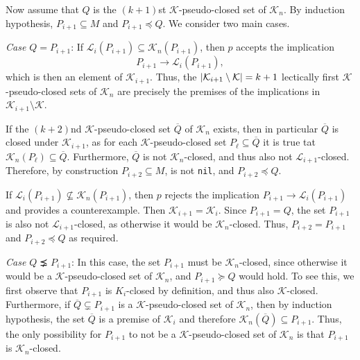 \begin{Proof}
  Now assume that $Q$ is the $(k+1)$st $\mathcal{K}$-pseudo-closed set of
  $\mathcal{K}_{n}$.  By induction hypothesis, $P_{i+1} \subseteq M$ and $P_{i+1} \preceq
  Q$.  We consider two main cases.

  \textit{Case $Q = P_{i+1}$}:  If $\mathcal{L}_{i}(P_{i+1}) \subseteq
  \mathcal{K}_{n}(P_{i+1})$, then $p$ accepts the implication
  \begin{equation*}
    P_{i+1} \to \mathcal{L}_{i}(P_{i+1}),
  \end{equation*}
  which is then an element of $\mathcal{K}_{i+1}$.  Thus, the $\lvert \mathcal{K}_{i+1}
    \setminus \mathcal{K} \rvert = k + 1$ lectically first $\mathcal{K}$-pseudo-closed sets of
  $\mathcal{K}_{n}$ are precisely the premises of the implications in $\mathcal{K}_{i+1}
  \setminus \mathcal{K}$.

  If the $(k+2)$nd $\mathcal{K}$-pseudo-closed set $\overline Q$ of $\mathcal{K}_{n}$
  exists, then in particular $\overline Q$ is closed under $\mathcal{K}_{i+1}$, as for
  each $\mathcal{K}$-pseudo-closed set $P_{\ell} \subseteq \overline Q$ it is true tat
  $\mathcal{K}_{n}(P_{\ell}) \subseteq \overline Q$.  Furthermore, $\overline Q$ is not
  $\mathcal{K}_{n}$-closed, and thus also not $\mathcal{L}_{i+1}$-closed.  Therefore, by
  construction $P_{i+2} \subseteq M$, \ie is not \lstinline{nil}, and $P_{i+2} \preceq Q$.

  If $\mathcal{L}_{i}(P_{i+1}) \not\subseteq \mathcal{K}_{n}(P_{i+1})$, then $p$ rejects
  the implication $P_{i+1} \to \mathcal{L}_{i}(P_{i+1})$ and provides a counterexample.
  Then $\mathcal{K}_{i+1} = \mathcal{K}_{i}$.  Since $P_{i+1} = Q$, the set $P_{i+1}$ is
  also not $\mathcal{L}_{i+1}$-closed, as otherwise it would be $\mathcal{K}_{n}$-closed.
  Thus, $P_{i+2} = P_{i+1}$ and $P_{i+2} \preceq Q$ as required.

  \textit{Case $Q \precneq P_{i+1}$}:  In this case, the set $P_{i+1}$ must be
  $\mathcal{K}_{n}$-closed, since otherwise it would be a $\mathcal{K}$-pseudo-closed set
  of $\mathcal{K}_{n}$, and $P_{i+1} \succeq Q$ would hold.  To see this, we first observe
  that $P_{i+1}$ is $K_{i}$-closed by definition, and thus also $\mathcal{K}$-closed.
  Furthermore, if $\overline Q \subsetneq P_{i+1}$ is a $\mathcal{K}$-pseudo-closed set of
  $\mathcal{K}_{n}$, then by induction hypothesis, the set $\overline Q$ is a premise of
  $\mathcal{K}_{i}$ and therefore $\mathcal{K}_{n}(\overline Q) \subseteq P_{i+1}$.  Thus, the
  only possibility for $P_{i+1}$ to not be a $\mathcal{K}$-pseudo-closed set of
  $\mathcal{K}_{n}$ is that $P_{i+1}$ is $\mathcal{K}_{n}$-closed.


\end{Proof}
